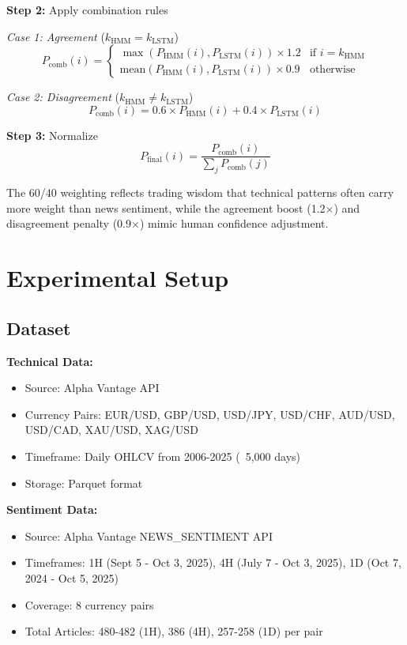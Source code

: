 \documentclass[conference]{IEEEtran}
\begin{document}
\textbf{Step 2:} Apply combination rules

\textit{Case 1: Agreement} ($k_{\text{HMM}} = k_{\text{LSTM}}$)
\begin{equation}
P_{\text{comb}}(i) = \begin{cases}
\max(P_{\text{HMM}}(i), P_{\text{LSTM}}(i)) \times 1.2 & \text{if } i = k_{\text{HMM}} \\
\text{mean}(P_{\text{HMM}}(i), P_{\text{LSTM}}(i)) \times 0.9 & \text{otherwise}
\end{cases}
\end{equation}

\textit{Case 2: Disagreement} ($k_{\text{HMM}} \neq k_{\text{LSTM}}$)
\begin{equation}
P_{\text{comb}}(i) = 0.6 \times P_{\text{HMM}}(i) + 0.4 \times P_{\text{LSTM}}(i)
\end{equation}

\textbf{Step 3:} Normalize
\begin{equation}
P_{\text{final}}(i) = \frac{P_{\text{comb}}(i)}{\sum_{j}P_{\text{comb}}(j)}
\end{equation}

The 60/40 weighting reflects trading wisdom that technical patterns often carry more weight than news sentiment, while the agreement boost (1.2×) and disagreement penalty (0.9×) mimic human confidence adjustment.

\section{Experimental Setup}

\subsection{Dataset}
\textbf{Technical Data:}
\begin{itemize}
\item Source: Alpha Vantage API
\item Currency Pairs: EUR/USD, GBP/USD, USD/JPY, USD/CHF, AUD/USD, USD/CAD, XAU/USD, XAG/USD
\item Timeframe: Daily OHLCV from 2006-2025 (~5,000 days)
\item Storage: Parquet format
\end{itemize}

\textbf{Sentiment Data:}
\begin{itemize}
\item Source: Alpha Vantage NEWS\_SENTIMENT API
\item Timeframes: 1H (Sept 5 - Oct 3, 2025), 4H (July 7 - Oct 3, 2025), 1D (Oct 7, 2024 - Oct 5, 2025)
\item Coverage: 8 currency pairs
\item Total Articles: 480-482 (1H), 386 (4H), 257-258 (1D) per pair
\end{itemize}
\end{document}
